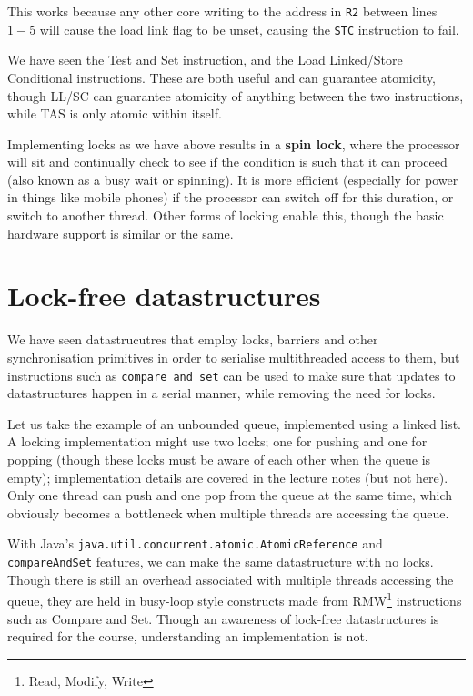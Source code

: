 This works because any other core writing to the address
in \texttt{R2} between lines $1-5$ will cause the load link flag to be
unset, causing the \texttt{STC} instruction to fail.

We have seen the Test and Set instruction, and the Load Linked/Store
Conditional instructions. These are both useful and can guarantee
atomicity, though LL/SC can guarantee atomicity of anything between
the two instructions, while TAS is only atomic within itself.

Implementing locks as we have above results in a \textbf{spin lock},
where the processor will sit and continually check to see if the
condition is such that it can proceed (also known as a busy wait or
spinning). It is more efficient (especially for power in things like
mobile phones) if the processor can switch off for this duration, or
switch to another thread. Other forms of locking enable this, though
the basic hardware support is similar or the same.


\section{Lock-free datastructures}

We have seen datastrucutres that employ locks, barriers and other
synchronisation primitives in order to serialise multithreaded access
to them, but instructions such as \texttt{compare and set} can be used
to make sure that updates to datastructures happen in a serial manner,
while removing the need for locks.

Let us take the example of an unbounded queue, implemented using a
linked list. A locking implementation might use two locks; one for
pushing and one for popping (though these locks must be aware of each
other when the queue is empty); implementation details are covered in
the lecture notes (but not here). Only one thread can push and one pop
from the queue at the same time, which obviously becomes a bottleneck
when multiple threads are accessing the queue.

With Java's \texttt{java.util.concurrent.atomic.AtomicReference}
and \texttt{compareAndSet} features, we can make the same
datastructure with no locks. Though there is still an overhead
associated with multiple threads accessing the queue, they are held in
busy-loop style constructs made from RMW\footnote{Read, Modify, Write}
instructions such as Compare and Set. Though an awareness of lock-free
datastructures is required for the course, understanding an
implementation is not.

